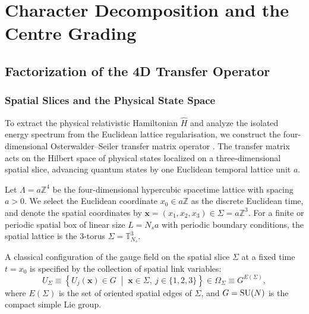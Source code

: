 \chapter{Character Decomposition and the Centre Grading}
\label{ch:transfer}
\label{ch:transfer_matrix_centre}

\section{Factorization of the 4D Transfer Operator}
\label{sec:transfer_factorization}

\subsection{Spatial Slices and the Physical State Space}
\label{subsec:spatial_slices_hilbert}

To extract the physical relativistic Hamiltonian $\hat{H}$ and analyze the isolated energy spectrum from the Euclidean lattice regularisation, we construct the four-dimensional Osterwalder--Seiler transfer matrix operator \cite{OsterwalderSeiler1978}. The transfer matrix acts on the Hilbert space of physical states localized on a three-dimensional spatial slice, advancing quantum states by one Euclidean temporal lattice unit $a$.

Let $\Lambda = a \mathbb{Z}^4$ be the four-dimensional hypercubic spacetime lattice with spacing $a > 0$. We select the Euclidean coordinate $x_0 \in a \mathbb{Z}$ as the discrete Euclidean time, and denote the spatial coordinates by $\mathbf{x} = (x_1, x_2, x_3) \in \Sigma = a \mathbb{Z}^3$. For a finite or periodic spatial box of linear size $L = N_s a$ with periodic boundary conditions, the spatial lattice is the 3-torus $\Sigma = \mathbb{T}_{N_s}^3$.

A classical configuration of the gauge field on the spatial slice $\Sigma$ at a fixed time $t = x_0$ is specified by the collection of spatial link variables:
\begin{equation}
\label{eq:spatial_config_space}
U_\Sigma \equiv \left\{ U_j(\mathbf{x}) \in G \;\middle|\; \mathbf{x} \in \Sigma, \ j \in \{1, 2, 3\} \right\} \in \Omega_\Sigma \equiv G^{E(\Sigma)},
\end{equation}
where $E(\Sigma)$ is the set of oriented spatial edges of $\Sigma$, and $G = \mathrm{SU}(N)$ is the compact simple Lie group.


